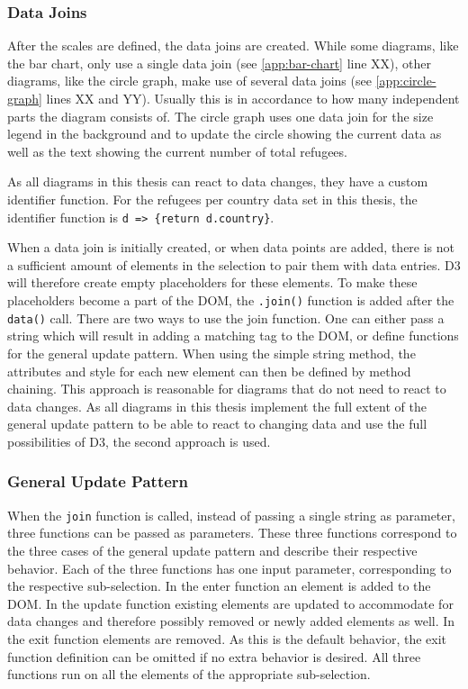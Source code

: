 \subsubsection{Data Joins}
After the scales are defined, the data joins are created. While some diagrams, like the bar chart, only use a single data join (see \ref{app:bar-chart} line XX), other diagrams, like the circle graph, make use of several data joins (see \ref{app:circle-graph} lines XX and YY). Usually this is in accordance to how many independent parts the diagram consists of. The circle graph uses one data join for the size legend in the background and to update the circle showing the current data as well as the text showing the current number of total refugees.

As all diagrams in this thesis can react to data changes, they have a custom identifier function. For the refugees per country data set in this thesis, the identifier function is \verb|d => {return d.country}|.

When a data join is initially created, or when data points are added, there is not a sufficient amount of elements in the selection to pair them with data entries. D3 will therefore create empty placeholders for these elements. To make these placeholders become a part of the DOM, the \verb|.join()| function is added after the \texttt{data()} call. There are two ways to use the join function. One can either pass a string which will result in adding a matching tag to the DOM, or define functions for the general update pattern. When using the simple string method, the attributes and style for each new element can then be defined by method chaining. This approach is reasonable for diagrams that do not need to react to data changes. As all diagrams in this thesis implement the full extent of the general update pattern to be able to react to changing data and use the full possibilities of D3, the second approach is used.

\subsubsection{General Update Pattern}

When the \texttt{join} function is called, instead of passing a single string as parameter, three functions can be passed as parameters. These three functions correspond to the three cases of the general update pattern and describe their respective behavior. Each of the three functions has one input parameter, corresponding to the respective sub-selection. In the enter function an element is added to the DOM. In the update function existing elements are updated to accommodate for data changes and therefore possibly removed or newly added elements as well. In the exit function elements are removed. As this is the default behavior, the exit function definition can be omitted if no extra behavior is desired. All three functions run on all the elements of the appropriate sub-selection.

